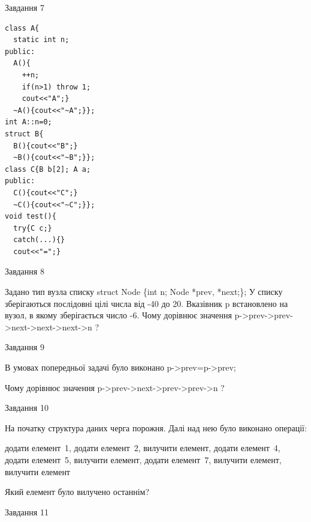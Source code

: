\documentclass[12pt, ukrainian]{article}
\begin{document}
{{{{{{{{{{{{{{{\begin{minipage}[t]{7cm}
               
{\begin{center}Завдання {7}\end{center}}
\vspace{-6mm}

\begin{verbatim}
class A{
  static int n;
public:
  A(){
    ++n; 
    if(n>1) throw 1;
    cout<<"A";}
  ~A(){cout<<"~A";}};
int A::n=0;
struct B{
  B(){cout<<"B";}
  ~B(){cout<<"~B";}};
class C{B b[2]; A a;
public:
  C(){cout<<"C";}
  ~C(){cout<<"~C";}};
void test(){
  try{C c;} 
  catch(...){} 
  cout<<"=";}
\end{verbatim}            


\end{minipage}
               
{\begin{center}Завдання {8}\end{center}}
\vspace{-6mm}
Задано тип вузла списку
struct Node \{int n; Node *prev, *next;\};
У списку зберігаються послідовні цілі числа від -40 до 20. Вказівник p встановлено на вузол, в якому зберігається число -6.
Чому дорівнює значення p->prev->prev->next->next->next->n ?\par

               
{\begin{center}Завдання {9}\end{center}}
\vspace{-6mm}
В умовах попередньої задачі було виконано p->prev=p->prev;

Чому дорівнює значення p->prev->next->prev->prev->n ?\par

\newpage
               
{\begin{center}Завдання {10}\end{center}}
\vspace{-6mm}
На початку структура даних черга порожня. Далі над нею було виконано операції:

додати елемент~1, додати елемент~2, вилучити елемент, додати елемент~4, додати елемент~5, вилучити елемент, додати елемент~7, вилучити елемент, вилучити елемент

Який елемент було вилучено останнім?\par

               
{\begin{center}Завдання {11}\end{center}}
\vspace{-6mm}

}}}}}}}}}}}}}}}
\end{document}
